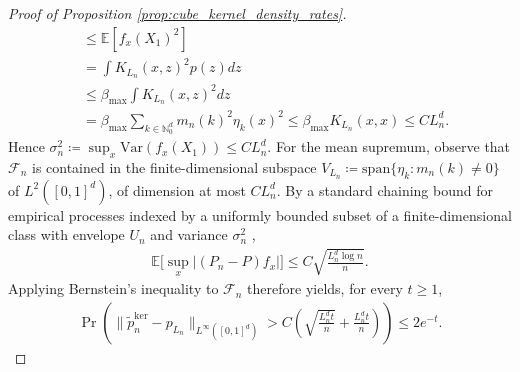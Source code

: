 \documentclass[11pt,reqno]{amsart}
\theoremstyle{definition}
\renewcommand{\tilde}{\widetilde}
\newcommand{\Ep}{\mathbb{E}}
\begin{document}
\begin{proof}[Proof of Proposition \ref{prop:cube_kernel_density_rates}]
\begin{align*}
    &\le
    \Ep[f_x(X_1)^2]
    \\
    &=
    \int K_{L_n}(x,z)^2 p(z)dz
    \\
    &\le
    \beta_{\max}\int K_{L_n}(x,z)^2 dz
    \\
    &=
    \beta_{\max}\sum_{k\in\mathbb N_0^d} m_n(k)^2\eta_k(x)^2
    \le
    \beta_{\max}K_{L_n}(x,x)
    \le
    C L_n^d.
\end{align*}
Hence $\sigma_n^2\coloneqq \sup_{x}\mathrm{Var}(f_x(X_1))\le C L_n^d$.
For the mean supremum, observe that $\mathcal F_n$ is contained in the finite-dimensional subspace $V_{L_n}\coloneqq\mathrm{span}\{\eta_k:m_n(k)\ne 0\}$ of $L^2([0,1]^d)$, of dimension at most $CL_n^d$. By a standard chaining bound for empirical processes indexed by a uniformly bounded subset of a finite-dimensional class with envelope $U_n$ and variance $\sigma_n^2$ \cite[Corollary~3.5.8]{gine2016mathematical},
\begin{align*}
    \Ep\Big[\sup_x |(P_n-P)f_x|\Big]
    \le
    C\sqrt{\frac{L_n^d\log n}{n}}.
\end{align*}
Applying Bernstein's inequality to $\mathcal F_n$ therefore yields, for every $t\ge 1$,
\begin{align}
    \Pr\left(
        \|\tilde p_n^{\mathrm{ker}}-p_{L_n}\|_{L^\infty([0,1]^d)}
        >
        C\left(
            \sqrt{\frac{L_n^d t}{n}}
            +
            \frac{L_n^d t}{n}
        \right)
    \right)
    \le
    2e^{-t}.
\end{align}


\end{proof}
\end{document}
